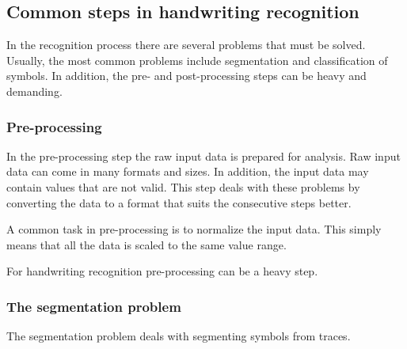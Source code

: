\subsection{Common steps in handwriting recognition}

In the recognition process there are several problems that must be solved. Usually, the most common problems include segmentation and classification of symbols. In addition, the pre- and post-processing steps can be heavy and demanding.

\subsubsection{Pre-processing}

In the pre-processing step the raw input data is prepared for analysis. Raw input data can come in many formats and sizes. In addition, the input data may contain values that are not valid. This step deals with these problems by converting the data to a format that suits the consecutive steps better.

A common task in pre-processing is to normalize the input data. This simply means that all the data is scaled to the same value range. 


For handwriting recognition pre-processing can be a heavy step. 

\subsubsection{The segmentation problem} \label{the_segmentation_problem}

The segmentation problem deals with segmenting symbols from traces. 

